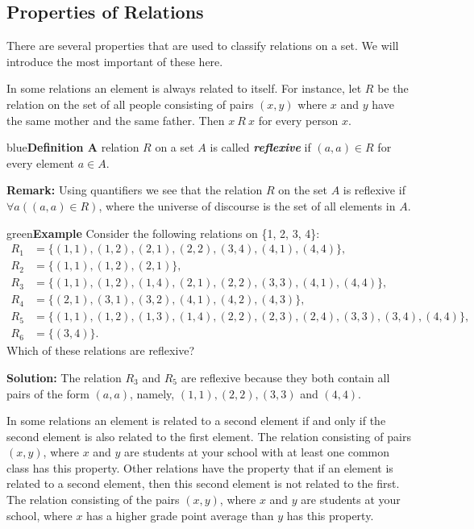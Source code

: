 \documentclass[11pt]{article}
\newenvironment{example}[1][\unskip]{\begin{mybox}{green}{\textbf{Example} {#1}}}{\end{mybox}}
\newenvironment{definition}[1]{\begin{mybox}{blue}{\textbf{Definition #1}}}{\end{mybox}}
\begin{document}
\subsection{Properties of Relations}
There are several properties that are used to classify relations on a set. We will introduce the most important of these here.

In some relations an element is always related to itself. For instance, let $R$ be the relation on the set of all people consisting of pairs $(x, y)$ where $x$ and $y$ have the same mother and the same father. Then $x\ R\ x$ for every person $x$.

\begin{definition}{3}
A relation $R$ on a set $A$ is called \textbf{\textit{reflexive}} if $(a, a) \in R$ for every element $a \in A$.
\end{definition}
\textbf{Remark:} Using quantifiers we see that the relation $R$ on the set $A$ is reflexive if $\forall a((a, a) \in R)$, where the universe of discourse is the set of all elements in $A$.

\begin{example}
Consider the following relations on \{1, 2, 3, 4\}:
\begin{align*}
    R_1 &= \{(1, 1), (1, 2), (2, 1), (2, 2), (3, 4), (4, 1), (4, 4)\},\\
    R_2 &= \{(1, 1), (1, 2), (2, 1)\},\\
    R_3 &= \{(1, 1), (1, 2), (1, 4), (2, 1), (2, 2), (3, 3), (4, 1), (4, 4)\},\\
    R_4 &= \{(2, 1), (3, 1), (3, 2), (4, 1), (4, 2), (4, 3)\},\\
    R_5 &= \{(1, 1), (1, 2), (1, 3), (1, 4), (2, 2), (2, 3), (2, 4), (3, 3), (3, 4), (4, 4)\},\\
    R_6 &= \{(3, 4)\}.
\end{align*}
Which of these relations are reflexive?

\textbf{Solution:} The relation $R_3$ and $R_5$ are reflexive because they both contain all pairs of the form $(a,a)$, namely, $(1,1), (2,2), (3, 3)$ and $(4, 4)$.
\end{example}


In some relations an element is related to a second element if and only if the second element is also related to the first element. The relation consisting of pairs $(x, y)$, where $x$ and $y$ are students at your school with at least one common class has this property. Other relations have the property that if an element is related to a second element, then this second element is not related to the first. The relation consisting of the pairs $(x, y)$, where $x$ and $y$ are students at your school, where $x$ has a higher grade point average than $y$ has this property.
\end{document}
